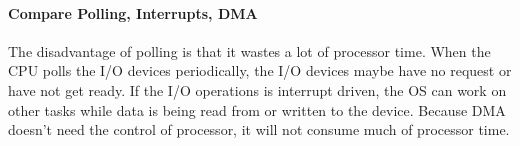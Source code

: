 \paragraph{Compare Polling, Interrupts, DMA}
The disadvantage of polling is that it wastes a lot of processor time. When the CPU polls the I/O devices periodically, the I/O devices maybe have no request or have not get ready. If the I/O operations is interrupt driven, the OS can work on other tasks while data is being read from or written to the device. Because DMA doesn't need the control of processor, it will not consume much of processor time.







